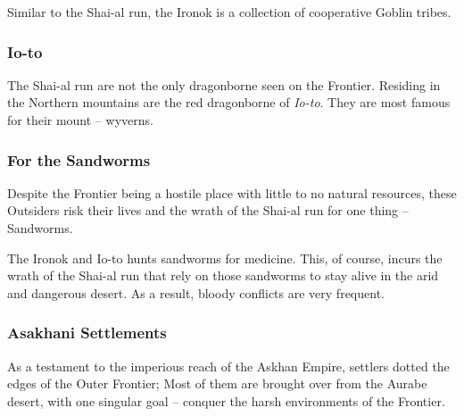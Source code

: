 \documentclass[../main.tex]{subfiles}
\begin{document}
Similar to the Shai-al run,
the Ironok is a collection of cooperative Goblin tribes.

\subsubsection{Io-to}
The Shai-al run are not the only dragonborne seen on the Frontier.
Residing in the Northern mountains are the red dragonborne of \emph{Io-to}.
They are most famous for their mount -- wyverns.

\subsubsection{For the Sandworms}
Despite the Frontier being a hostile place with little to no natural resources,
these Outsiders risk their lives and the wrath of the Shai-al run for one thing
-- Sandworms.

The Ironok and Io-to hunts sandworms for medicine. This, of course, incurs
the wrath of the Shai-al run that rely on those sandworms to stay alive
in the arid and dangerous desert. As a result, bloody conflicts are very
frequent.

\subsubsection{Asakhani Settlements}
As a testament to the imperious reach of the Askhan Empire, settlers
dotted the edges of the Outer Frontier; Most of them are brought over
from the Aurabe desert, with one singular goal -- conquer the harsh
environments of the Frontier.
\end{document}
